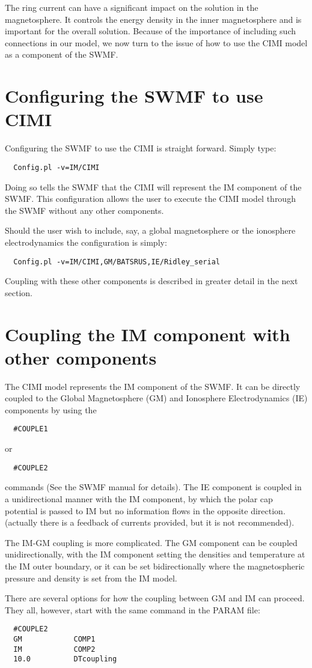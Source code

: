 The ring current can have a significant impact on the solution in the 
magnetosphere. It controls the energy density in the inner magnetosphere and
is important for the overall solution. 
Because of the importance of including 
such connections in our model, we now turn to the issue of how to use the CIMI
model as a component of the SWMF. 

\section{Configuring the SWMF to use CIMI}
Configuring the SWMF to use the CIMI is straight forward. Simply type:
\begin{verbatim}
  Config.pl -v=IM/CIMI
\end{verbatim}
Doing so tells the SWMF that the CIMI will represent the IM component of the 
SWMF. This configuration allows the user to execute the CIMI model through the 
SWMF without any other components.

Should the user wish to include, say, a global magnetosphere or the 
ionosphere electrodynamics the configuration is simply:
\begin{verbatim}
  Config.pl -v=IM/CIMI,GM/BATSRUS,IE/Ridley_serial
\end{verbatim}
Coupling with these other components is described in greater detail in the 
next section.

\section{Coupling the IM component with other components}
The CIMI model represents the IM component of the SWMF. It can be directly coupled 
to the Global Magnetosphere (GM) and Ionosphere Electrodynamics (IE) components 
by using the
\begin{verbatim}
  #COUPLE1
\end{verbatim}
 or
\begin{verbatim}
  #COUPLE2
\end{verbatim}
commands (See the SWMF manual for details). The IE component is coupled 
in a unidirectional manner with the IM component, by which the polar cap 
potential is passed to IM but no information 
flows in the opposite direction. (actually there is a feedback of currents provided, but it is not recommended). 

The IM-GM coupling is more complicated. The GM component can be coupled 
unidirectionally, with the IM component setting the densities and temperature at 
the IM outer boundary, or it can be set bidirectionally where the 
magnetospheric pressure and density is set from the IM model. 

There are several options for how the coupling between GM and IM can proceed. 
They all, however, start with the same command in the PARAM file:
\begin{verbatim}
  #COUPLE2
  GM            COMP1
  IM            COMP2
  10.0          DTcoupling
\end{verbatim}

